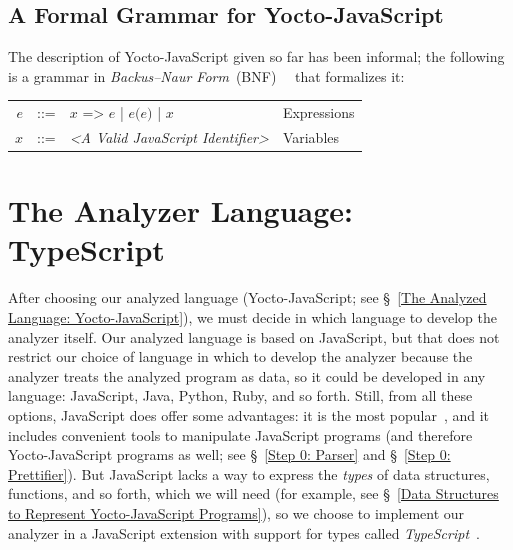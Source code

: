 \documentclass[12pt, oneside]{book}
\begin{document}
\begin{mdframed}[frametitle = {Advanced}]
\subsection{A Formal Grammar for Yocto-JavaScript}
\label{A Formal Grammar for Yocto-JavaScript}

The description of Yocto-JavaScript given so far has been informal; the following is a grammar in \emph{Backus–Naur Form}~(BNF)~\cite{bnf}~\cite[§~4.2]{dragon-book} that formalizes it:

\begin{center}
\begin{tabular}{rcll}
$e$ & ::= & $x\texttt{ => }e$ | $e\texttt{(}e\texttt{)}$ | $x$ & Expressions \\
$x$ & ::= & \emph{<A Valid JavaScript Identifier>} & Variables \\
\end{tabular}
\end{center}

\end{mdframed}

\section{The Analyzer Language: TypeScript}
\label{The Analyzer Language: TypeScript}

After choosing our analyzed language (Yocto-JavaScript; see §~\ref{The Analyzed Language: Yocto-JavaScript}), we must decide in which language to develop the analyzer itself. Our analyzed language is based on JavaScript, but that does not restrict our choice of language in which to develop the analyzer because the analyzer treats the analyzed program as data, so it could be developed in any language: JavaScript, Java, Python, Ruby, and so forth. Still, from all these options, JavaScript does offer some advantages: it is the most popular~\cite{stack-overflow-developer-survey, jet-brains-developer-survey}, and it includes convenient tools to manipulate JavaScript programs (and therefore Yocto-JavaScript programs as well; see §~\ref{Step 0: Parser} and §~\ref{Step 0: Prettifier}). But JavaScript lacks a way to express the \emph{types} of data structures, functions, and so forth, which we will need (for example, see §~\ref{Data Structures to Represent Yocto-JavaScript Programs}), so we choose to implement our analyzer in a JavaScript extension with support for types called \emph{TypeScript}~\cite{typescript, typescript-deep-dive, understanding-typescript}.
\end{document}
